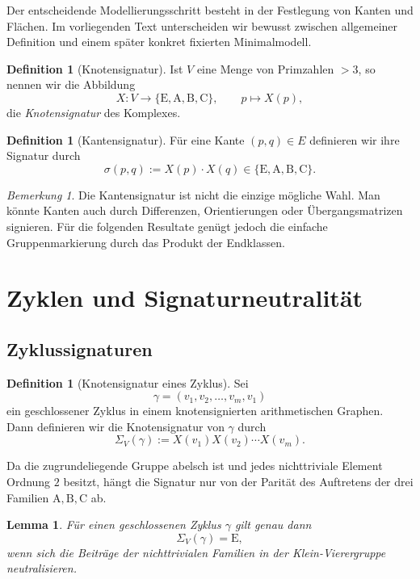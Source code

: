 \documentclass[11pt,a4paper]{article}
\newtheorem{lemma}[theorem]{Lemma}
\theoremstyle{definition}
\newtheorem{definition}[theorem]{Definition}
\theoremstyle{remark}
\newtheorem{remark}[theorem]{Bemerkung}
\newcommand{\Efam}{\mathrm{E}}
\newcommand{\Afam}{\mathrm{A}}
\newcommand{\Bfam}{\mathrm{B}}
\newcommand{\Cfam}{\mathrm{C}}
\begin{document}
	Der entscheidende Modellierungsschritt besteht in der Festlegung von Kanten und Flächen. Im vorliegenden Text unterscheiden wir bewusst zwischen allgemeiner Definition und einem später konkret fixierten Minimalmodell.
	
	\begin{definition}[Knotensignatur]
		Ist $V$ eine Menge von Primzahlen $>3$, so nennen wir die Abbildung
		\[
		X:V\to\{\Efam,\Afam,\Bfam,\Cfam\},\qquad p\mapsto X(p),
		\]
		die \emph{Knotensignatur} des Komplexes.
	\end{definition}
	
	\begin{definition}[Kantensignatur]
		Für eine Kante $(p,q)\in E$ definieren wir ihre Signatur durch
		\[
		\sigma(p,q):=X(p)\cdot X(q)\in\{\Efam,\Afam,\Bfam,\Cfam\}.
		\]
	\end{definition}
	
	\begin{remark}
		Die Kantensignatur ist nicht die einzige mögliche Wahl. Man könnte Kanten auch durch Differenzen, Orientierungen oder Übergangsmatrizen signieren. Für die folgenden Resultate genügt jedoch die einfache Gruppenmarkierung durch das Produkt der Endklassen.
	\end{remark}
	
	\section{Zyklen und Signaturneutralität}
	
	\subsection{Zyklussignaturen}
	
	\begin{definition}[Knotensignatur eines Zyklus]
		Sei
		\[
		\gamma=(v_1,v_2,\dots,v_m,v_1)
		\]
		ein geschlossener Zyklus in einem knotensignierten arithmetischen Graphen. Dann definieren wir die Knotensignatur von $\gamma$ durch
		\[
		\Sigma_V(\gamma):=X(v_1)X(v_2)\cdots X(v_m).
		\]
	\end{definition}
	
	Da die zugrundeliegende Gruppe abelsch ist und jedes nichttriviale Element Ordnung $2$ besitzt, hängt die Signatur nur von der Parität des Auftretens der drei Familien $\Afam,\Bfam,\Cfam$ ab.
	
	\begin{lemma}
		Für einen geschlossenen Zyklus $\gamma$ gilt genau dann
		\[
		\Sigma_V(\gamma)=\Efam,
		\]
		wenn sich die Beiträge der nichttrivialen Familien in der Klein-Vierergruppe neutralisieren.
	\end{lemma}
	
\end{document}
